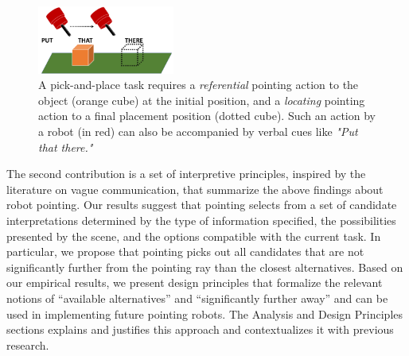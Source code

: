 \begin{figure}[t]
    \centering
    \includegraphics[width=0.4\textwidth, trim={0 0.3in 0 0in},clip]{figures/putthatthere2.png}
    \caption{A pick-and-place task requires a \textit{referential} pointing action to the object (orange cube) at the initial position, and a \textit{locating} pointing action to a final placement position (dotted cube). Such an action by a robot (in red) can also be accompanied by verbal cues like \textit{"Put that there."}}
    \label{fig:pap}
\end{figure}

The second contribution is a set of interpretive principles, inspired by the literature on vague communication, that summarize the above findings about robot pointing.  Our results suggest that pointing selects from a set of candidate interpretations determined by the type of information specified, the possibilities presented by the scene, and the options compatible with the current task.  In particular, we propose that pointing picks out all candidates that are not significantly further from the pointing ray than the closest alternatives.  Based on our empirical results, we present design principles that formalize the relevant notions of ``available alternatives'' and ``significantly further away'' and can be used in implementing future pointing robots.  The Analysis and Design Principles sections explains and justifies this approach and contextualizes it with previous research.










